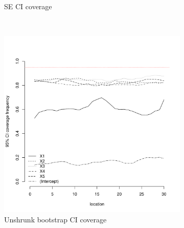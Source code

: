 \documentclass[authoryear, review, 11pt]{elsarticle}
\begin{document}
\begin{figure}
\begin{subfigure}[b]{0.45\textwidth}
		\caption{SE CI coverage}
	\end{subfigure}%
	\\%
	\begin{subfigure}[b]{0.45\textwidth}
	\centering
		\includegraphics[width=\textwidth]{../../figures/simulation/15.12.profile_unshrunk_bootstrap_coverage.pdf}
		\caption{Unshrunk bootstrap CI coverage}
	\end{subfigure}%
	~ %
	\begin{subfigure}[b]{0.45\textwidth}
	\centering

\end{subfigure}
\end{figure}
\end{document}
